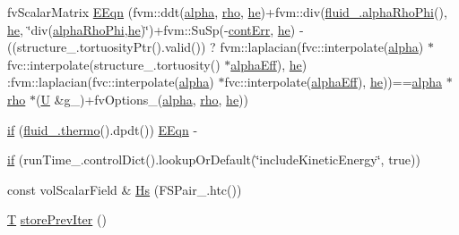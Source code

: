 \begin{DoxyCompactItemize}
fv\+Scalar\+Matrix \hyperlink{EEqn__1p_8H_adfc6a0535901685ad54433b48d98aa2f}{E\+Eqn} (fvm\+::ddt(\hyperlink{UEqn__1pl_8H_a7fe02434a19f3e00e927f32adcbb193b}{alpha}, \hyperlink{EEqn__1pl_8H_ac955f87ac2b79f02f420cae087fc52b1}{rho}, \hyperlink{EEqn__1pl_8H_aaacc8fea926e2b83e418a1ad3c1e8c43}{he})+fvm\+::div(\hyperlink{updateAlphaPhiAndInitControls__1p_8H_adb16eab5a684ddb62e40a6ffdc2d646c}{fluid\+\_\+.\+alpha\+Rho\+Phi}(), \hyperlink{EEqn__1pl_8H_aaacc8fea926e2b83e418a1ad3c1e8c43}{he}, \char`\"{}div(\hyperlink{updateAlphaPhiAndInitControls__1p_8H_adb16eab5a684ddb62e40a6ffdc2d646c}{alpha\+Rho\+Phi},\hyperlink{EEqn__1pl_8H_aaacc8fea926e2b83e418a1ad3c1e8c43}{he})\char`\"{})+fvm\+::\+Su\+Sp(-\/\hyperlink{EEqn__1pl_8H_ac772c4e2535e2242a1e052c268cb9c19}{cont\+Err}, \hyperlink{EEqn__1pl_8H_aaacc8fea926e2b83e418a1ad3c1e8c43}{he}) -\/((structure\+\_\+.\+tortuosity\+Ptr().valid()) ? fvm\+::laplacian(fvc\+::interpolate(\hyperlink{UEqn__1pl_8H_a7fe02434a19f3e00e927f32adcbb193b}{alpha}) $\ast$fvc\+::interpolate(structure\+\_\+.\+tortuosity() $\ast$\hyperlink{EEqn__1pl_8H_a38742d7dee2b92bbd408c844c42eeab8}{alpha\+Eff}), \hyperlink{EEqn__1pl_8H_aaacc8fea926e2b83e418a1ad3c1e8c43}{he}) \+:fvm\+::laplacian(fvc\+::interpolate(\hyperlink{UEqn__1pl_8H_a7fe02434a19f3e00e927f32adcbb193b}{alpha}) $\ast$fvc\+::interpolate(\hyperlink{EEqn__1pl_8H_a38742d7dee2b92bbd408c844c42eeab8}{alpha\+Eff}), \hyperlink{EEqn__1pl_8H_aaacc8fea926e2b83e418a1ad3c1e8c43}{he}))==\hyperlink{UEqn__1pl_8H_a7fe02434a19f3e00e927f32adcbb193b}{alpha} $\ast$\hyperlink{EEqn__1pl_8H_ac955f87ac2b79f02f420cae087fc52b1}{rho} $\ast$(\hyperlink{UEqn__1pl_8H_abe23fa3afe09cc511569a7dca4160561}{U} \&g\+\_\+)+fv\+Options\+\_\+(\hyperlink{UEqn__1pl_8H_a7fe02434a19f3e00e927f32adcbb193b}{alpha}, \hyperlink{EEqn__1pl_8H_ac955f87ac2b79f02f420cae087fc52b1}{rho}, \hyperlink{EEqn__1pl_8H_aaacc8fea926e2b83e418a1ad3c1e8c43}{he}))
\item 
\hyperlink{EEqn__1p_8H_a2196a4e412c1f089d1f62abdfbb4ffa6}{if} (\hyperlink{EEqns__2p_8H_a9d615e711281a88a96c648787c7dbd32}{fluid\+\_\+.\+thermo}().dpdt()) \hyperlink{EEqn__1pl_8H_afbe3b0df5936ee9102f8bea26f93e95a}{E\+Eqn} -\/
\item 
\hyperlink{EEqn__1p_8H_a8f9839ad578be9f2e4f7f0b78e215a51}{if} (run\+Time\+\_\+.\+control\+Dict().lookup\+Or\+Default(\char`\"{}include\+Kinetic\+Energy\char`\"{}, true))
\item 
const vol\+Scalar\+Field \& \hyperlink{EEqn__1p_8H_ab8fc5669aa3ba2d4b66ff43ff446d633}{Hs} (F\+S\+Pair\+\_\+.\+htc())
\item 
\hyperlink{EEqn__1pl_8H_ad0f94aa7ea43d4be0bae24e3a89aad0c}{T} \hyperlink{EEqn__1p_8H_a311ed2e9de66976b1b00bdc99ace80f9}{store\+Prev\+Iter} ()

\end{DoxyCompactItemize}
